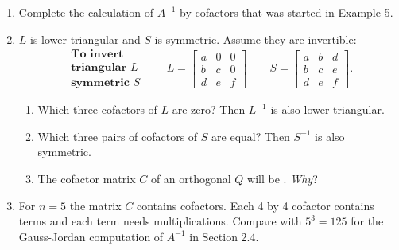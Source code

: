 \documentclass[14pt, a4paper]{article}
\begin{document}
\begin{enumerate}[resume]
    \item Complete the calculation of $A^{-1}$ by cofactors that was started in Example 5.

    \item $L$ is lower triangular and $S$ is symmetric. Assume they are invertible:
          \[
              \begin{array}{l}
                  \textbf{To invert}     \\
                  \textbf{triangular } L \\
                  \textbf{symmetric } S
              \end{array} \qquad
              L = \begin{bmatrix} a & 0 & 0 \\ b & c & 0 \\ d & e & f \end{bmatrix} \qquad
              S = \begin{bmatrix} a & b & d \\ b & c & e \\ d & e & f \end{bmatrix} .
          \]
          \begin{enumerate}
              \item Which three cofactors of $L$ are zero? Then $L^{-1}$ is also lower triangular.
              \item Which three pairs of cofactors of $S$ are equal? Then $S^{-1}$ is also symmetric.
              \item The cofactor matrix $C$ of an orthogonal $Q$ will be \underline{\hspace{1cm}}. \textit{Why}?
          \end{enumerate}

    \item For $n = 5$ the matrix $C$ contains \underline{\hspace{1cm}} cofactors. Each 4 by 4 cofactor contains \underline{\hspace{1cm}} terms and each term needs \underline{\hspace{1cm}} multiplications. Compare with $5^3 = 125$ for the Gauss-Jordan computation of $A^{-1}$ in Section 2.4.
\end{enumerate}
\end{document}
